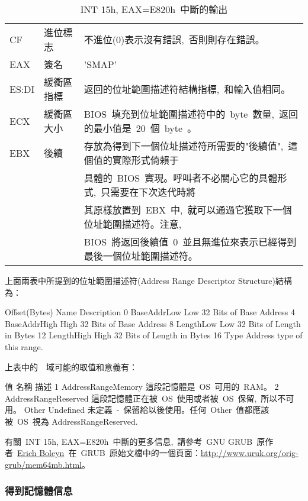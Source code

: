 \begin{center}\begin{longtable}{lll}
\caption[]{INT 15h, EAX=E820h~中斷的輸出}\label{e820_output}\\
\hline
CF & 進位標志 & 不進位(0)表示沒有錯誤,~否則則存在錯誤。\\
EAX & 簽名   & 'SMAP'\\
ES:DI & 緩衝區指標 & 返回的位址範圍描述符結構指標,~和輸入值相同。\\
ECX & 緩衝區大小 & BIOS~填充到位址範圍描述符中的~byte~數量,~返回的最小值是~20~個~byte~。\\
EBX & 後續 & 存放為得到下一個位址描述符所需要的"後續值",~這個值的實際形式倚賴于\\
& & 具體的~BIOS~實現。呼叫者不必關心它的具體形式,~只需要在下次迭代時將\\
& & 其原樣放置到~EBX~中,~就可以通過它獲取下一個位址範圍描述符。注意,~\\
& & BIOS~將返回後續值~0~並且無進位來表示已經得到最後一個位址範圍描述符。\\
\hline
\end{longtable}\end{center}

上面兩表中所提到的位址範圍描述符(Address Range Descriptor Structure)結構為：
\begin{Command}
Offset(Bytes)     Name        Description
      0       BaseAddrLow     Low 32 Bits of Base Address
      4       BaseAddrHigh    High 32 Bits of Base Address
      8       LengthLow       Low 32 Bits of Length in Bytes
     12       LengthHigh      High 32 Bits of Length in Bytes
     16       Type            Address type of  this range.
\end{Command}

上表中的~~域可能的取值和意義有：
\begin{Command}
值      名稱                     描述
1       AddressRangeMemory      這段記憶體是~OS~可用的~RAM。
2       AddressRangeReserved    這段記憶體正在被~OS~使用或者被~OS~保留,~所以不可用。
Other   Undefined               未定義~-~保留給以後使用。任何~Other~值都應該被~OS~視為                                          AddressRangeReserved.
\end{Command}

有關~INT 15h, EAX=E820h~中斷的更多信息,~請參考~GNU GRUB~原作者~\href{http://www.uruk.org/~erich/}{Erich Boleyn}~在~GRUB~原始文檔中的一個頁面：\url{http://www.uruk.org/orig-grub/mem64mb.html}。

\subsubsection{得到記憶體信息}

